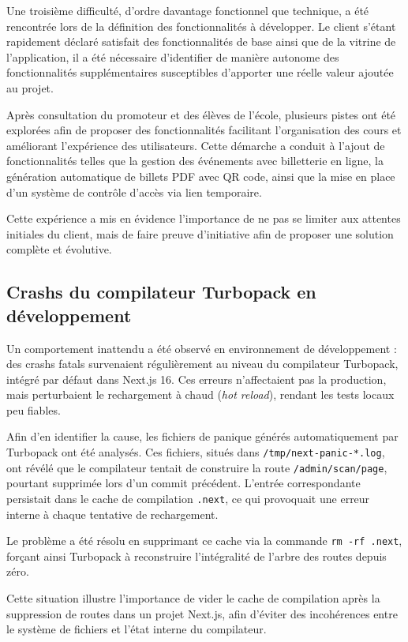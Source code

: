 \documentclass{article}
\begin{document}
Une troisième difficulté, d'ordre davantage fonctionnel que technique, 
a été rencontrée lors de la définition des fonctionnalités à développer. 
Le client s'étant rapidement déclaré satisfait des fonctionnalités de base 
ainsi que de la vitrine de l'application, il a été nécessaire d'identifier 
de manière autonome des fonctionnalités supplémentaires susceptibles 
d'apporter une réelle valeur ajoutée au projet.

Après consultation du promoteur et des élèves de l'école, plusieurs 
pistes ont été explorées afin de proposer des fonctionnalités facilitant 
l'organisation des cours et améliorant l'expérience des utilisateurs. 
Cette démarche a conduit à l'ajout de fonctionnalités telles que la 
gestion des événements avec billetterie en ligne, la génération automatique 
de billets PDF avec QR code, ainsi que la mise en place d'un système de 
contrôle d'accès via lien temporaire.

Cette expérience a mis en évidence l'importance de ne pas se limiter aux 
attentes initiales du client, mais de faire preuve d'initiative afin de 
proposer une solution complète et évolutive.

\subsection{Crashs du compilateur Turbopack en développement}
Un comportement inattendu a été observé en environnement de développement :
des crashs fatals survenaient régulièrement au niveau du compilateur
Turbopack, intégré par défaut dans Next.js 16. Ces erreurs n'affectaient
pas la production, mais perturbaient le rechargement à chaud
(\textit{hot reload}), rendant les tests locaux peu fiables.

Afin d'en identifier la cause, les fichiers de panique générés
automatiquement par Turbopack ont été analysés. Ces fichiers, situés dans
\texttt{/tmp/next-panic-*.log}, ont révélé que le compilateur tentait de
construire la route \texttt{/admin/scan/page}, pourtant supprimée lors
d'un commit précédent. L'entrée correspondante persistait dans le cache
de compilation \texttt{.next}, ce qui provoquait une erreur interne à
chaque tentative de rechargement.

Le problème a été résolu en supprimant ce cache via la commande
\texttt{rm -rf .next}, forçant ainsi Turbopack à reconstruire l'intégralité
de l'arbre des routes depuis zéro.

Cette situation illustre l'importance de vider le cache de compilation
après la suppression de routes dans un projet Next.js, afin d'éviter
des incohérences entre le système de fichiers et l'état interne du
compilateur.
\end{document}
